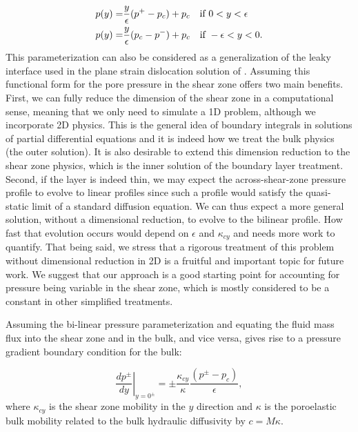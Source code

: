\documentclass[draft]{agujournal2019}
\begin{document}
\begin{align}
    p(y) = & \frac{y}{\epsilon}(p^+ - p_c) + p_c \text{\quad if } 0 < y < \epsilon \nonumber \\ 
    p(y) = & \frac{y}{\epsilon}(p_c - p^-) + p_c \text{\quad if } - \epsilon < y < 0 .
    \label{eq:linear}
\end{align}
This parameterization can also be considered as a generalization of the leaky interface used in the plane strain dislocation solution of . Assuming this functional form for the pore pressure in the shear zone offers two main benefits. First, we can fully reduce the dimension of the shear zone in a computational sense, meaning that we only need to simulate a 1D problem, although we incorporate 2D physics. This is the general idea of boundary integrals in solutions of partial differential equations and it is indeed how we treat the bulk physics (the outer solution). It is also desirable to extend this dimension reduction to the shear zone physics, which is the inner solution of the boundary layer treatment. Second, if the layer is indeed thin, we may expect the across-shear-zone pressure profile to evolve to linear profiles since such a profile would satisfy the quasi-static limit of a standard diffusion equation. We can thus expect a more general solution, without a dimensional reduction, to evolve to the bilinear profile. How fast that evolution occurs would depend on $\epsilon$ and $\kappa_{cy}$ and needs more work to quantify. That being said, we stress that a rigorous treatment of this problem without dimensional reduction in 2D is a fruitful and important topic for future work. We suggest that our approach is a good starting point for accounting for pressure being variable in the shear zone, which is mostly considered to be a constant in other simplified treatments.

Assuming the bi-linear pressure parameterization and equating the fluid mass flux into the shear zone and in the bulk, and vice versa, gives rise to a pressure gradient boundary condition for the bulk:

\begin{equation}
 \left. \frac{d p^\pm}{d y} \right|_{y = 0^\pm} = \pm \frac{\kappa_{cy}}{\kappa} \frac{(p^\pm - p_c)}{\epsilon},
 \label{eq:BC}
\end{equation}
where $\kappa_{cy}$ is the shear zone mobility in the $y$ direction and $\kappa$ is the poroelastic bulk mobility related to the bulk hydraulic diffusivity by $c = M\kappa$.
\end{document}
